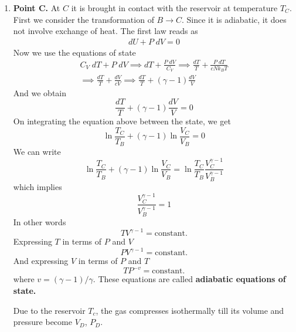 \documentclass[../../../Main.tex]{subfiles}
\begin{document}
\begin{enumerate}
    \item \textbf{Point C.} At $C$ it is brought in contact with the reservoir at temperature $T_C$. First we consider the transformation of $B\rightarrow C$. Since it is adiabatic, it does not involve exchange of heat. The first law reads as
    \begin{align*}
        dU+P\;dV=0
    \end{align*}
    Now we use the equations of state 
    \begin{multline*}
        C_V\;dT+P\;dV\implies dT+\frac{P\;dV}{C_V}\implies\frac{dT}{T}+\frac{P\;dT}{cNk_BT}\\\implies \frac{dT}{T}+\frac{dV}{cV}\implies\frac{dT}{T}+(\gamma-1)\frac{dV}{V}
    \end{multline*}
    And we obtain
    \begin{equation*}
        \frac{dT}{T}+(\gamma-1)\frac{dV}{V}=0
    \end{equation*}
    On integrating the equation above between the state, we get 
    \begin{equation*}
        \ln \frac{T_C}{T_B}+(\gamma-1)\ln\frac{V_C}{V_B}=0
    \end{equation*}
    We can write 
    \begin{equation*}
        \ln \frac{T_C}{T_B}+(\gamma-1)\ln\frac{V_C}{V_B}=\ln \frac{T_C}{T_B}\frac{V_C^{\gamma-1}}{V_B^{\gamma-1}} 
    \end{equation*}
    which implies
    \begin{equation*}
        \frac{V_C^{\gamma-1}}{V_B^{\gamma-1}} =1
    \end{equation*}
    In other words
    \begin{equation*}
        TV^{\gamma-1}=\text{constant.}
    \end{equation*}
    Expressing $T$ in terms of $P$ and $V$
    \begin{equation*}
        PV^{\gamma-1}=\text{constant.}
    \end{equation*}
    And expressing $V$ in terms of $P$ and $T$
    \begin{equation*}
        TP^{-v}=\text{constant.}
    \end{equation*}
    where $v=(\gamma-1)/\gamma$. These equations are called \textbf{adiabatic equations of state.}

    Due to the reservoir $T_c$, the gas compresses isothermally till its volume and pressure become $V_D$, $P_D$.


\end{enumerate}
\end{document}
